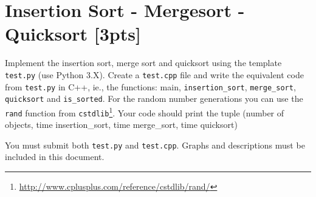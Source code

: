 \documentclass{article}
\begin{document}
\section{Insertion Sort - Mergesort - Quicksort [3pts]}
Implement the insertion sort, merge sort and quicksort using the template \texttt{test.py} (use Python 3.X). Create a \texttt{test.cpp} file and write the equivalent code from \texttt{test.py} in C++, ie., the functions: main, \texttt{insertion\_sort}, \texttt{merge\_sort}, \texttt{quicksort} and \texttt{is\_sorted}. For the random number generations you can use the \texttt{rand} function from \texttt{cstdlib}\footnote{\url{http://www.cplusplus.com/reference/cstdlib/rand/}}. Your code should print the tuple (number of objects, time insertion\_sort, time merge\_sort, time quicksort)

You must submit both \texttt{test.py} and \texttt{test.cpp}. Graphs and descriptions must be included in this document. 
\end{document}
